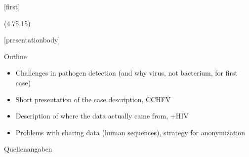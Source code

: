 \documentclass[aspectratio=169,t]{beamer}
\subtitle{The case in a few slides}
\begin{document}
[first]

\begin{frame}[noframenumbering]
    \titlepage
    \begin{textblock}{10}(4.75,15)
        \cite{logo}
    \end{textblock}
\end{frame}

[presentationbody] 

\begin{frame}{Outline}
	\begin{itemize}
		\item Challenges in pathogen detection (and why virus, not bacterium, for first case)
		\item Short presentation of the case description, CCHFV
		\item Description of where the data actually came from, +HIV
		\item Problems with sharing data (human sequences), strategy for anonymization
	\end{itemize}
\end{frame}

\begin{frame}[allowframebreaks]{Quellenangaben}
    \printbibliography
\end{frame}


\end{document}
